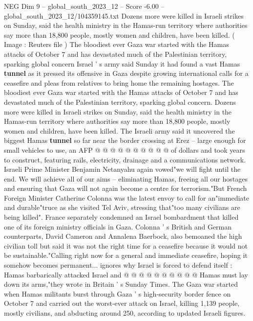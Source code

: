 \begin{textsample}{NEG Dim 9 – global\_south\_2023\_12 – Score -6.00 – global\_south\_2023\_12/104359145.txt}  \label{ex:f9_neg_306}
Dozens more were killed in Israeli strikes on Sunday, said the health ministry in the Hamas-run territory where authorities say more than 18,800 people, mostly women and children, have been killed. ( Image : Reuters file ) The bloodiest ever Gaza war started with the Hamas attacks of October 7 and has devastated much of the Palestinian territory, sparking global concern Israel ' s army said Sunday it had found a vast Hamas \textbf{tunnel} as it pressed its offensive in Gaza despite growing international calls for a ceasefire and pleas from relatives to bring home the remaining hostages.
The bloodiest ever Gaza war started with the Hamas attacks of October 7 and has devastated much of the Palestinian territory, sparking global concern.
Dozens more were killed in Israeli strikes on Sunday, said the health ministry in the Hamas-run territory where authorities say more than 18,800 people, mostly women and children, have been killed.
The Israeli army said it uncovered the biggest Hamas \textbf{tunnel} so far near the border crossing at Erez -- large enough for small vehicles to use, an AFP @ @ @ @ @ @ @ @ @ @ of dollars and took years to construct, featuring rails, electricity, drainage and a communications network.
Israeli Prime Minister Benjamin Netanyahu again vowed"we will fight until the end.
We will achieve all of our aims -- eliminating Hamas, freeing all our hostages and ensuring that Gaza will not again become a centre for terrorism."But French Foreign Minister Catherine Colonna was the latest envoy to call for an"immediate and durable"truce as she visited Tel Aviv, stressing that"too many civilians are being killed".
France separately condemned an Israel bombardment that killed one of its foreign ministry officials in Gaza.
Colonna ' s British and German counterparts, David Cameron and Annalena Baerbock, also bemoaned the high civilian toll but said it was not the right time for a ceasefire because it would not be sustainable."Calling right now for a general and immediate ceasefire, hoping it somehow becomes permanent... ignores why Israel is forced to defend itself : Hamas barbarically attacked Israel and @ @ @ @ @ @ @ @ @ @ Hamas must lay down its arms,"they wrote in Britain ' s Sunday Times.
The Gaza war started when Hamas militants burst through Gaza ' s high-security border fence on October 7 and carried out the worst-ever attack on Israel, killing 1,139 people, mostly civilians, and abducting around 250, according to updated Israeli figures.

\end{textsample}
